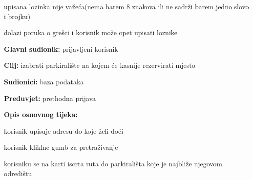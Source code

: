 \begin{packed_item}
\begin{packed_item}
\begin{packed_enum}
							\end{packed_enum}
							
							\item[4.b] upisana lozinka nije važeća(nema barem 8 znakova ili ne sadrži barem jedno slovo i brojku)
							
							\begin{packed_enum}
								
								\item dolazi poruka o grešci i korisnik može opet upisati loznike
								
							\end{packed_enum}
							
						\end{packed_item}
					\end{packed_item}
					
					\noindent {}
					\begin{packed_item}
						
						\item \textbf{Glavni sudionik: }prijavljeni korisnik
						\item  \textbf{Cilj:} izabrati parkiralište na kojem će kasnije rezervirati mjesto
						\item  \textbf{Sudionici:} baza podataka
						\item  \textbf{Preduvjet:} prethodna prijava
						\item  \textbf{Opis osnovnog tijeka:}
						
						\item[] \begin{packed_enum}
							
							\item korisnik upisuje adresu do koje želi doći
							\item korisnik kliklne gumb za pretraživanje
							\item korisniku se na karti iscrta ruta do parkirališta koje je najbliže njegovom odredištu
						
						\end{packed_enum}
						
						 
					\end{packed_item}
					
